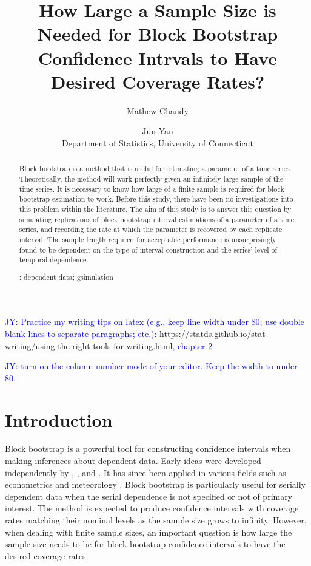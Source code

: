 \documentclass[12pt, letterpaper, titlepage]{article}
\title{How Large a Sample Size is Needed for Block Bootstrap Confidence Intrvals
  to Have Desired Coverage Rates?}
\author{Mathew Chandy
  \and Jun Yan\\[1ex]
  Department of Statistics, University of Connecticut\\
}
\date{}
\newcommand{\jy}[1]{\textcolor{blue}{JY: #1}}
\begin{document}
 
\maketitle

\begin{abstract}
Block bootstrap is a method that is useful for estimating a parameter of a time
series. Theoretically, the method will work perfectly given an infinitely
large sample of the time series. It is necessary to know how large of a finite
sample is required for block bootstrap estimation to work. Before this study,
there have been no investigations into this problem within the literature. The
aim of this study is to answer this question by simulating replications of
block bootstrap interval estimations of a parameter of a time series, and
recording the rate at which the parameter is recovered by each replicate
interval. The sample length required for acceptable performance is
unsurprisingly found to be dependent on the type of interval construction and
the series' level of temporal dependence.


\bigskip
{}:
dependent data; gsimulation
\end{abstract}

\doublespace

\jy{Practice my writing tips on latex (e.g., keep line width under 80; use
  double blank lines to separate paragraphs; etc.):
  \url{
https://statds.github.io/stat-writing/using-the-right-tools-for-writing.html},
  chapter 2}

\jy{turn on the column number mode of your editor. Keep the width to under 80.}


\section{Introduction}
\label{sec:intro}

Block bootstrap is a powerful tool for constructing confidence intervals when
making inferences about dependent data. Early ideas were developed
independently by \citet{hall1985resampling}, \citet{carlstein1986use}, and 
\citet{kunsch1989jackknife}.
It has since been applied in various fields such as econometrics
\citep{mackinnon2006bootstrap} and meteorology \citep{varga2017generalised}.
Block bootstrap is particularly useful for serially dependent
data when the serial dependence is not specified or not of primary interest.
The method is expected to produce confidence intervals with coverage rates
matching their nominal levels as the sample size grows to infinity. However,
when dealing with finite sample sizes, an important question is how large the
sample size needs to be for block bootstrap confidence intervals to have the
desired coverage rates.
\end{document}
